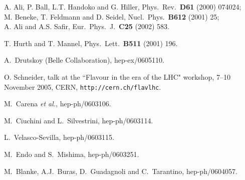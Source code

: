 \documentclass[11pt]{cernrep}
\begin{document}
\begin{thebibliography}{999}
A. Ali, P. Ball, L.T. Handoko and G. Hiller,
{ Phys.\ Rev.}~{\bf D61} (2000) 074024;\\
M. Beneke, T. Feldmann and D. Seidel,
{ Nucl.\ Phys.}~{\bf B612} (2001) 25;\\
A. Ali and A.S. Safir,
{ Eur.\ Phys.\ J.}~{\bf C25} (2002) 583.

T. Hurth and T. Mannel,
{ Phys.\ Lett.}~{\bf B511} (2001) 196.

A.~Drutskoy (Belle Collaboration),
  hep-ex/0605110.

O. Schneider, talk at the ``Flavour in the era of the LHC" workshop,
7--10 November 2005, CERN, {\tt http://cern.ch/flavlhc}.

M.~Carena {\it et al.}, %
  hep-ph/0603106.
  
M.~Ciuchini and L.~Silvestrini,
  hep-ph/0603114.
  
L.~Velasco-Sevilla,
  hep-ph/0603115.
  
M.~Endo and S.~Mishima,
  hep-ph/0603251.
  
M.~Blanke, A.J.~Buras, D.~Guadagnoli and C.~Tarantino,
  hep-ph/0604057.
  

\end{thebibliography}
\end{document}
